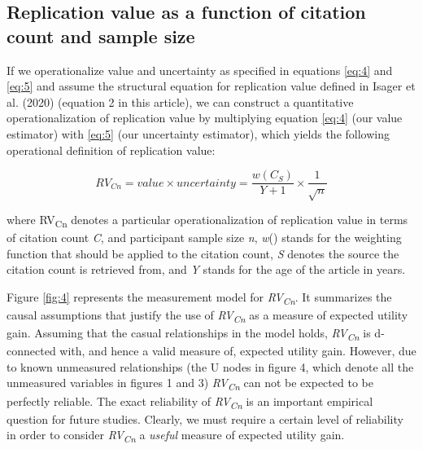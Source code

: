 \documentclass[
  english,
  jou,floatsintext]{apa6}
\begin{document}
\hypertarget{replication-value-as-a-function-of-citation-count-and-sample-size}{%
\subsection{Replication value as a function of citation count and sample size}\label{replication-value-as-a-function-of-citation-count-and-sample-size}}

If we operationalize value and uncertainty as specified in equations \eqref{eq:4} and \eqref{eq:5} and assume the structural equation for replication value defined in Isager et al. (2020) (equation 2 in this article), we can construct a quantitative operationalization of replication value by multiplying equation \eqref{eq:4} (our value estimator) with \eqref{eq:5} (our uncertainty estimator), which yields the following operational definition of replication value:

\begin{equation} 
  \tag{6}
  RV_{Cn} = value\times uncertainty = \frac{w(C_{S})}{Y+1}\times\frac{1}{\sqrt{n}}
  \label{eq:6}
\end{equation}

where RV\textsubscript{Cn} denotes a particular operationalization of replication value in terms of citation count \emph{C}, and participant sample size \emph{n}, \emph{w}() stands for the weighting function that should be applied to the citation count, \emph{S} denotes the source the citation count is retrieved from, and \emph{Y} stands for the age of the article in years.

Figure \ref{fig:4} represents the measurement model for \emph{RV\textsubscript{Cn}}. It summarizes the causal assumptions that justify the use of \emph{RV\textsubscript{Cn}} as a measure of expected utility gain. Assuming that the casual relationships in the model holds, \emph{RV\textsubscript{Cn}} is d-connected with, and hence a valid measure of, expected utility gain. However, due to known unmeasured relationships (the U nodes in figure 4, which denote all the unmeasured variables in figures 1 and 3) \emph{RV\textsubscript{Cn}} can not be expected to be perfectly reliable. The exact reliability of \emph{RV\textsubscript{Cn}} is an important empirical question for future studies. Clearly, we must require a certain level of reliability in order to consider \emph{RV\textsubscript{Cn}} a \emph{useful} measure of expected utility gain.
\end{document}
